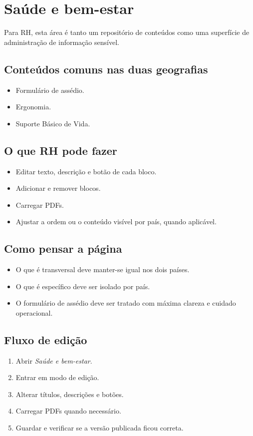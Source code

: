 \section{Saúde e bem-estar}
Para RH, esta área é tanto um repositório de conteúdos como uma superfície de administração de informação sensível.

\subsection{Conteúdos comuns nas duas geografias}
\begin{itemize}
  \item Formulário de assédio.
  \item Ergonomia.
  \item Suporte Básico de Vida.
\end{itemize}

\subsection{O que RH pode fazer}
\begin{itemize}
  \item Editar texto, descrição e botão de cada bloco.
  \item Adicionar e remover blocos.
  \item Carregar PDFs.
  \item Ajustar a ordem ou o conteúdo visível por país, quando aplicável.
\end{itemize}

\subsection{Como pensar a página}
\begin{itemize}
  \item O que é transversal deve manter-se igual nos dois países.
  \item O que é específico deve ser isolado por país.
  \item O formulário de assédio deve ser tratado com máxima clareza e cuidado operacional.
\end{itemize}

\subsection{Fluxo de edição}
\begin{enumerate}
  \item Abrir \textit{Saúde e bem-estar}.
  \item Entrar em modo de edição.
  \item Alterar títulos, descrições e botões.
  \item Carregar PDFs quando necessário.
  \item Guardar e verificar se a versão publicada ficou correta.
\end{enumerate}

